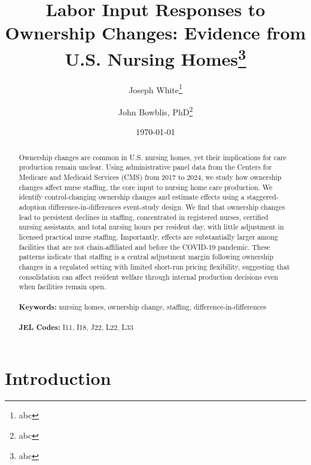 \documentclass[12pt]{article}
\begin{document}
\begin{titlepage}
\title{Labor Input Responses to Ownership Changes: Evidence from U.S. Nursing Homes\thanks{abc}}

\author{
  Joseph White\thanks{abc}
  \and
  John Bowblis, PhD\thanks{abc}
}

\date{\today}
\maketitle
\begin{abstract}
\noindent Ownership changes are common in U.S. nursing homes, yet their implications for care production remain unclear. Using administrative panel data from the Centers for Medicare and Medicaid Services (CMS) from 2017 to 2024, we study how ownership changes affect nurse staffing, the core input to nursing home care production. We identify control-changing ownership changes and estimate effects using a staggered-adoption difference-in-differences event-study design. We find that ownership changes lead to persistent declines in staffing, concentrated in registered nurses, certified nursing assistants, and total nursing hours per resident day, with little adjustment in licensed practical nurse staffing. Importantly, effects are substantially larger among facilities that are not chain-affiliated and before the COVID-19 pandemic. These patterns indicate that staffing is a central adjustment margin following ownership changes in a regulated setting with limited short-run pricing flexibility, suggesting that consolidation can affect resident welfare through internal production decisions even when facilities remain open. \\
\vspace{0in}\\
\noindent\textbf{Keywords:} nursing homes, ownership change, staffing, difference-in-differences\\
\vspace{0in}\\
\noindent\textbf{JEL Codes:} I11, I18, J22, L22, L33\\

\bigskip
\end{abstract}
\setcounter{page}{0}
\thispagestyle{empty}
\end{titlepage}
\pagebreak \newpage




\doublespacing


\section{Introduction} \label{sec:introduction}
\end{document}
